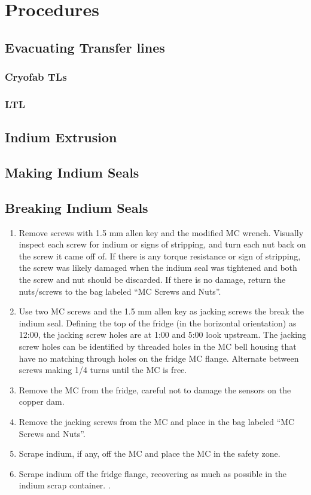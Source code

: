 \chapter{Procedures} 
\label{procedures}  
\section{Evacuating Transfer lines}

\subsection{Cryofab TLs}

\subsection{LTL}

\section{Indium Extrusion}

\section{Making Indium Seals}

\section{Breaking Indium Seals}
\begin{enumerate}
 \item Remove screws with 1.5 mm allen key and the modified MC wrench.  Visually inspect each screw for indium or signs of stripping, and turn each nut back on the screw it came off of.  If there is any torque resistance or sign of stripping, the screw was likely damaged when the indium seal was tightened and both the screw and nut should be discarded.  If there is no damage, return the nuts/screws to the bag labeled ``MC Screws and Nuts''.
\item Use two MC screws and the 1.5 mm allen key as jacking screws the break the indium seal.  Defining the top of the fridge (in the horizontal orientation) as 12:00, the jacking screw holes are at 1:00 and 5:00 look upstream.  The jacking screw holes can be identified by threaded holes in the MC bell housing that have no matching through holes on the fridge MC flange.  Alternate between screws making 1/4 turns until the MC is free.
\item Remove the MC from the fridge, careful not to damage the sensors on the copper dam.
\item Remove the jacking screws from the MC and place in the bag labeled ``MC Screws and Nuts''.
\item Scrape indium, if any, off the MC and place the MC in the safety zone.
\item Scrape indium off the fridge flange, recovering as much as possible in the indium scrap container.  .
\end{enumerate}


